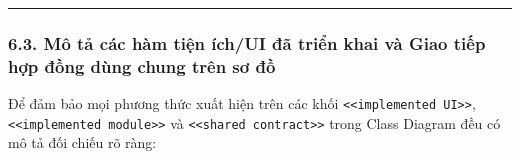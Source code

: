 \documentclass[11pt,a4paper]{article}
\begin{document}
\begin{center}\rule{0.5\linewidth}{0.5pt}\end{center}

\hypertarget{muxf4-tux1ea3-cuxe1c-huxe0m-tiux1ec7n-uxedchui-ux111uxe3-triux1ec3n-khai-vuxe0-giao-tiux1ebfp-hux1ee3p-ux111ux1ed3ng-duxf9ng-chung-truxean-sux1a1-ux111ux1ed3}{%
\subsubsection{6.3. Mô tả các hàm tiện ích/UI đã triển khai và Giao tiếp
hợp đồng dùng chung trên sơ
đồ}\label{muxf4-tux1ea3-cuxe1c-huxe0m-tiux1ec7n-uxedchui-ux111uxe3-triux1ec3n-khai-vuxe0-giao-tiux1ebfp-hux1ee3p-ux111ux1ed3ng-duxf9ng-chung-truxean-sux1a1-ux111ux1ed3}}

Để đảm bảo mọi phương thức xuất hiện trên các khối
\texttt{\textless{}\textless{}implemented\ UI\textgreater{}\textgreater{}},
\texttt{\textless{}\textless{}implemented\ module\textgreater{}\textgreater{}}
và
\texttt{\textless{}\textless{}shared\ contract\textgreater{}\textgreater{}}
trong Class Diagram đều có mô tả đối chiếu rõ ràng:
\end{document}
